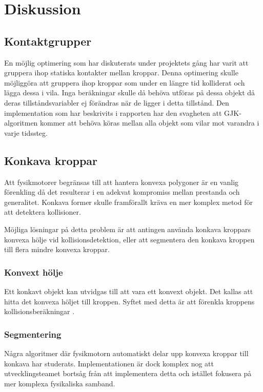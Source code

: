 \documentclass[a4paper,12pt,twopage,swedish]{article}
\begin{document}



\section{Diskussion}


\subsection{Kontaktgrupper}
En möjlig optimering som har diskuterats under projektets gång har varit att gruppera ihop statiska kontakter mellan kroppar. Denna optimering skulle möjliggöra att gruppera ihop kroppar som under en längre tid kolliderat och lägga dessa i vila. Inga beräkningar skulle då behöva utföras på dessa objekt då deras tillståndsvariabler ej förändras när de ligger i detta tillstånd. Den implementation som har beskrivits i rapporten har den svagheten att GJK-algoritmen kommer att behöva köras mellan alla objekt som vilar mot varandra i varje tidssteg.

\subsection{Konkava kroppar}
Att fysikmotorer begränsas till att hantera konvexa polygoner är en vanlig förenkling då det resulterar i en adekvat kompromiss mellan prestanda och generalitet. Konkava former skulle framförallt kräva en mer komplex metod för att detektera kollisioner.

Möjliga lösningar på detta problem är att antingen använda konkava kroppars konvexa hölje vid kollisionsdetektion, eller att segmentera den konkava kroppen till flera mindre konvexa kroppar.

\subsubsection{Konvext hölje}
Ett konkavt objekt kan utvidgas till att vara ett konvext objekt. Det kallas att hitta det konvexa höljet till kroppen. Syftet med detta är att förenkla kroppens kollisionsberäkningar \cite[s.~29]{avis97}.

\subsubsection{Segmentering}
Några algoritmer där fysikmotorn automatiskt delar upp konvexa kroppar till konkava har studerats.
Implementationen är dock komplex nog att utvecklingsteamet bortsåg från att implementera detta och istället fokusera på mer komplexa fysikaliska samband.
\end{document}
